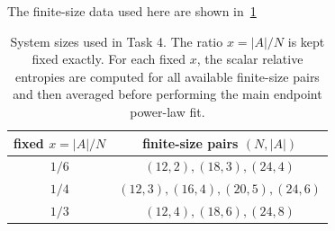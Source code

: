 \documentclass{article}
\theoremstyle{plain}
\theoremstyle{definition}
\theoremstyle{plain}
\begin{document}
The finite-size data used here are shown in~\cref{tab:task4_fixed_x_size_setting}
\begin{table}[H]
    \centering
    \setlength{\extrarowheight}{4pt}
    \begin{tabular}{|c|c|}
    \hline
       fixed \(x=|A|/N\) & finite-size pairs \((N,|A|)\) \\
       \hline
       \(1/6\) & \((12,2),(18,3),(24,4)\) \\
       \hline
       \(1/4\) & \((12,3),(16,4),(20,5),(24,6)\) \\
       \hline
       \(1/3\) & \((12,4),(18,6),(24,8)\) \\
       \hline
    \end{tabular}
    \caption{System sizes used in Task 4. The ratio \(x=|A|/N\) is kept fixed exactly. For each fixed \(x\), the scalar relative entropies are computed for all available finite-size pairs and then averaged before performing the main endpoint power-law fit.}
    \label{tab:task4_fixed_x_size_setting}
\end{table}
\end{document}
